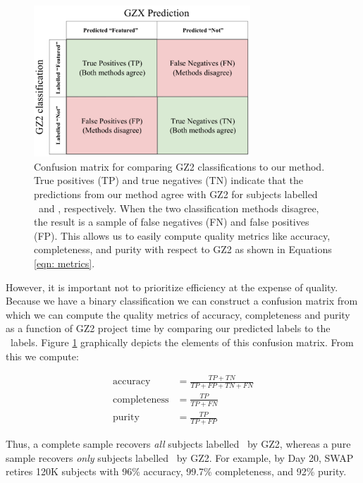\begin{figure} 
\centering
\includegraphics[width=3.2in]{Figures/human_machine/f4.pdf}
\caption[Confusion matrix between predictions and ground truth defines quality metrics.]{Confusion matrix for comparing GZ2 classifications to our method.  True positives (TP) and true negatives (TN) indicate that the predictions from our method agree with GZ2 for subjects labelled \feat~and \notfeat, respectively. When the two classification methods disagree, the result is a sample of false negatives (FN) and false positives (FP). This allows us to easily compute  quality metrics like accuracy, completeness, and purity with respect to GZ2 as shown in Equations \ref{eqn: metrics}.} 
\label{fig: confusion matrix}
\end{figure}

However, it is important not to prioritize efficiency at the expense of quality. Because we have a binary classification we can construct a confusion matrix from which we can compute the quality metrics of accuracy, completeness and purity as a function of GZ2 project time by comparing our predicted labels to the \raw~labels. Figure \ref{fig: confusion matrix}
graphically depicts the elements of this confusion matrix. From this we compute: 
 
\begin{align*}\label{eqn: metrics}
\mathrm{accuracy} &= \frac{TP + TN}{TP + FP + TN + FN} \\
\mathrm{completeness} &= \frac{TP}{TP +FN }\tag{3} \\
\mathrm{purity} &= \frac{TP}{TP + FP}
\end{align*}

Thus, a complete sample recovers \textit{all} subjects labelled \feat~by GZ2, whereas a pure sample recovers \textit{only} subjects labelled \feat~by GZ2. For example, by Day 20, SWAP retires 120K subjects with 96\% accuracy, 99.7\% completeness, and 92\% purity. 
 
